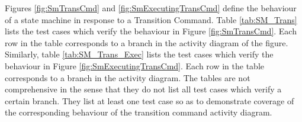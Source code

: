 \documentclass[a4paper,10pt]{article}
\begin{document}
\label{Appendix_D_SM_Trans}
Figures \ref{fig:SmTransCmd} and \ref{fig:SmExecutingTransCmd} define the behaviour 
of a state machine in response to a Transition Command. 
Table \ref{tab:SM_Trans} lists the test cases which verify the behaviour in Figure 
\ref{fig:SmTransCmd}.
Each row in the table corresponds to a branch in the  activity diagram of the figure. 
Similarly, table \ref{tab:SM_Trans_Exec} lists the test cases which verify the behaviour 
in Figure \ref{fig:SmExecutingTransCmd}. 
Each row in the table corresponds to a branch in the activity diagram. 
The tables are not comprehensive in the sense that they do not list all test cases 
which verify a certain branch. 
They list at least one test case so as to demonstrate coverage of the corresponding 
behaviour of the transition command activity diagram.
\end{document}
